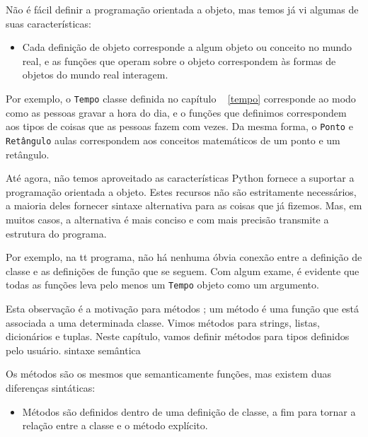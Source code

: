 \documentclass[10pt]{book}
\begin{document}
\begin{exercise}
\begin{v erbatim}
{Não é fácil definir a programação orientada a objeto, mas temos
já vi algumas de suas características:

\begin{itemize}

\Programs itens são feitos de definições e função de objeto
definições, e a maior parte do cálculo é expresso em termos
de operações sobre objetos.

\item Cada definição de objeto corresponde a algum objeto ou conceito
no mundo real, e as funções que operam sobre o objeto
correspondem às formas de objetos do mundo real interagem.

\end{itemize}

Por exemplo, o {\tt Tempo} classe definida no capítulo ~ \ref {tempo}
corresponde ao modo como as pessoas gravar a hora do dia, e o
funções que definimos correspondem aos tipos de coisas que as pessoas fazem com
vezes. Da mesma forma, o {\tt Ponto} e {\tt Retângulo} aulas
correspondem aos conceitos matemáticos de um ponto e um retângulo.

Até agora, não temos aproveitado as características Python fornece a
suportar a programação orientada a objeto. Estes
recursos não são estritamente necessários, a maioria deles fornecer
sintaxe alternativa para as coisas que já fizemos. Mas, em muitos casos,
a alternativa é mais conciso e com mais precisão transmite a
estrutura do programa.

Por exemplo, na {\Tempo tt} programa, não há nenhuma óbvia
conexão entre a definição de classe e as definições de função
que se seguem. Com algum exame, é evidente que todas as funções
leva pelo menos um {\tt Tempo} objeto como um argumento.

Esta observação é a motivação para {métodos \bf}; um método é
uma função que está associada a uma determinada classe.
Vimos métodos para strings, listas, dicionários e tuplas.
Neste capítulo, vamos definir métodos para tipos definidos pelo usuário.
\index{} sintaxe
\index{} semântica

Os métodos são os mesmos que semanticamente funções, mas existem
duas diferenças sintáticas:

\begin{itemize}

\item Métodos são definidos dentro de uma definição de classe, a fim
para tornar a relação entre a classe e o método explícito.


\end{itemize}}
\end{v erbatim}
\end{exercise}
\end{document}
